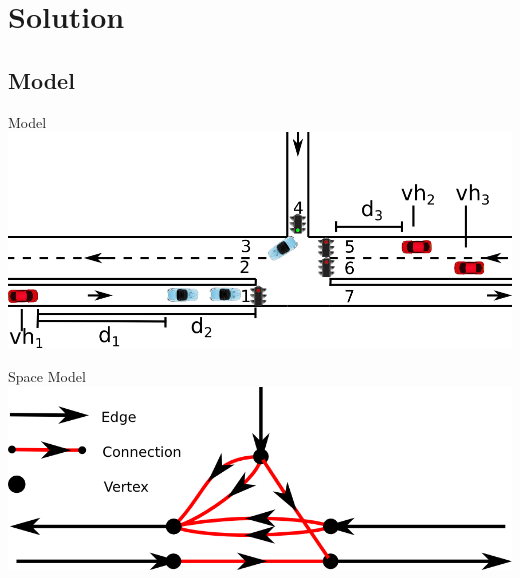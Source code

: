 
\section{Solution}
\subsection{Model}
\begin{frame}{Model}
\includegraphics[width=1\textwidth]{images/introNetwork.png}
\end{frame}

\begin{frame}{Space Model}
\includegraphics[width=1\textwidth]{images/ConnectionNetwork.png}
\end{frame}

